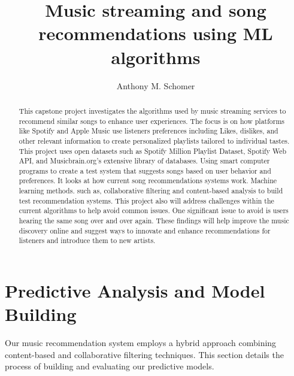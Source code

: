 \documentclass[runningheads]{llncs}
\begin{document}
%
\title{Music streaming and song recommendations using ML algorithms}
%
%
\author{Anthony M. Schomer}
%
%
%
\maketitle              %
%
\begin{abstract}
This capstone project investigates the algorithms used by music streaming services to recommend similar songs to enhance user experiences. The focus is on how platforms like Spotify and Apple Music use listeners preferences including Likes, dislikes, and other relevant information to create personalized playlists tailored to individual tastes. This project uses open datasets such as Spotify Million Playlist Dataset, Spotify Web API, and Musicbrain.org's extensive library of databases. Using smart computer programs to create a test system that suggests songs based on user behavior and preferences. It looks at how current song recommendations systems work. Machine learning methods. such as, collaborative filtering and content-based analysis to build test recommendation systems. This project also will address challenges within the current algorithms to help avoid common issues. One significant issue to avoid is users hearing the same song over and over again. These findings will help improve the music discovery online and suggest ways to innovate and enhance recommendations for listeners and introduce them to new artists. 

\end{abstract}

\section{Predictive Analysis and Model Building}

Our music recommendation system employs a hybrid approach combining content-based and collaborative filtering techniques. This section details the process of building and evaluating our predictive models.
\end{document}
